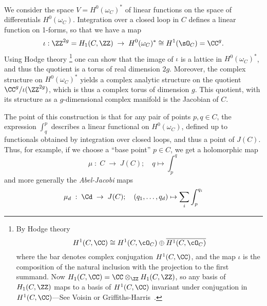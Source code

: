 We consider the space $V = H^0(\omega_C)^*$ of linear functions on the space of differentials $H^0(\omega_C)$.  Integration over a closed loop in $C$ defines a linear function on 1-forms, so that we have a map
$$
\iota: \ZZ^{2g} = H_1(C,\ZZ) \; \to \;  H^0(\omega_C)^* \cong H^1(\sO_C) = \CC^{g}.
$$
Using  Hodge theory
\footnote{By Hodge theory 
$$
H^1(C, \CC) \cong H^1(C, \cO_C) \oplus \overline{H^1(C, \cO_C)}
$$
where the bar denotes complex conjugation $H^1(C, \CC)$, and the map $\iota$ is the composition of 
 the natural inclusion with the projection to the first summand.
 Now
$H_1(C,\CC) = \CC\otimes_\ZZ H_1(C,\ZZ)$, so any basis of $H_1(C,\ZZ)$ maps to a basis of 
 $H^1(C, \CC)$ invariant under conjugation in $H^1(C, \CC)$---See Voisin \cite{} or Griffiths-Harris~\cite{}. 
}
one can show that the image of $\iota$ is a lattice in $H^0(\omega_C)^*$, and thus the quotient
is a torus of real dimension $2g$. Moreover, the
complex structure on $H^0(\omega_C)^*$ yields a complex analytic structure on the quotient $\CC^{g}/\iota(\ZZ^{2g})$, which is thus a complex torus of  dimension $g$.  This quotient, with its structure as a $g$-dimensional complex manifold is the Jacobian of $C$.

The point of this construction is that for any pair of points $p, q \in C$, the expression $\int_q^p$ describes a linear functional on $H^0(\omega_C)$, defined up to functionals obtained by integration over closed loops, and thus a point of $J(C)$. Thus, for example, if we choose a ``base point''  $p\in C$, we get a holomorphic map
$$
\mu \; : \; C \; \to \; J(C); \quad q\mapsto \int_{p}^{q}
$$
and more generally the \emph{Abel-Jacobi} maps
$$
\mu_d \; : \; \Cd \; \to \; J(C); \quad (q_1,\dots, q_d) \mapsto \sum_i \int_{p}^{q_i}
$$

%

